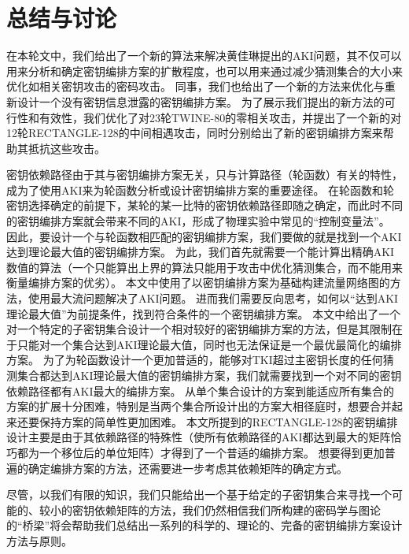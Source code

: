 
\chapter{总结与讨论}
\label{chap:Con}
在本轮文中，我们给出了一个新的算法来解决黄佳琳提出的AKI问题，其不仅可以用来分析和确定密钥编排方案的扩散程度，也可以用来通过减少猜测集合的大小来优化如相关密钥攻击的密码攻击。
同事，我们也给出了一个新的方法来优化与重新设计一个没有密钥信息泄露的密钥编排方案。
为了展示我们提出的新方法的可行性和有效性，我们优化了对23轮TWINE-80的零相关攻击，并提出了一个新的对12轮RECTANGLE-128的中间相遇攻击，同时分别给出了新的密钥编排方案来帮助其抵抗这些攻击。

密钥依赖路径由于其与密钥编排方案无关，只与计算路径（轮函数）有关的特性，成为了使用AKI来为轮函数分析或设计密钥编排方案的重要途径。
在轮函数和轮密钥选择确定的前提下，某轮的某一比特的密钥依赖路径即随之确定，而此时不同的密钥编排方案就会带来不同的AKI，形成了物理实验中常见的“控制变量法”。
因此，要设计一个与轮函数相匹配的密钥编排方案，我们要做的就是找到一个AKI达到理论最大值的密钥编排方案。
为此，我们首先就需要一个能计算出精确AKI数值的算法（一个只能算出上界的算法只能用于攻击中优化猜测集合，而不能用来衡量编排方案的优劣）。
本文中使用了以密钥编排方案为基础构建流量网络图的方法，使用最大流问题解决了AKI问题。
进而我们需要反向思考，如何以“达到AKI理论最大值”为前提条件，找到符合条件的一个密钥编排方案。
本文中给出了一个对一个特定的子密钥集合设计一个相对较好的密钥编排方案的方法，但是其限制在于只能对一个集合达到AKI理论最大值，同时也无法保证是一个最优最简化的编排方案。
为了为轮函数设计一个更加普适的，能够对TKI超过主密钥长度的任何猜测集合都达到AKI理论最大值的密钥编排方案，我们就需要找到一个对不同的密钥依赖路径都有AKI最大的编排方案。
从单个集合设计的方案到能适应所有集合的方案的扩展十分困难，特别是当两个集合所设计出的方案大相径庭时，想要合并起来还要保持方案的简单性更加困难。
本文所提到的RECTANGLE-128的密钥编排设计主要是由于其依赖路径的特殊性（使所有依赖路径的AKI都达到最大的矩阵恰巧都为一个移位后的单位矩阵）才得到了一个普适的编排方案。
想要得到更加普遍的确定编排方案的方法，还需要进一步考虑其依赖矩阵的确定方式。

尽管，以我们有限的知识，我们只能给出一个基于给定的子密钥集合来寻找一个可能的、较小的密钥依赖矩阵的方法，我们仍然相信我们所构建的密码学与图论的“桥梁”将会帮助我们总结出一系列的科学的、理论的、完备的密钥编排方案设计方法与原则。
